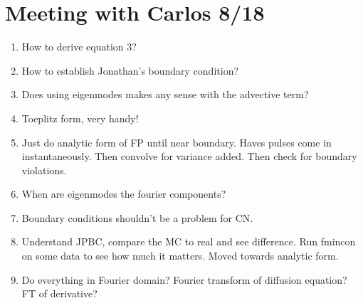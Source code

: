 \documentclass[12pt]{article}
\begin{document}
\section{Meeting with Carlos 8/18}

\begin{enumerate}
\item How to derive equation 3?
\item How to establish Jonathan's boundary condition?
\item Does using eigenmodes makes any sense with the advective term?
\item Toeplitz form, very handy!
\item Just do analytic form of FP until near boundary. Haves pulses come in instantaneously. Then convolve for variance added. Then check for boundary violations.
\item When are eigenmodes the fourier components?
\item Boundary conditions shouldn't be a problem for CN.
\item Understand JPBC, compare the MC to real and see difference. Run fmincon on some data to see how much it matters. Moved towards analytic form.
\item Do everything in Fourier domain? Fourier transform of diffusion equation? FT of derivative?

\end{enumerate}
 

%
\end{document}
